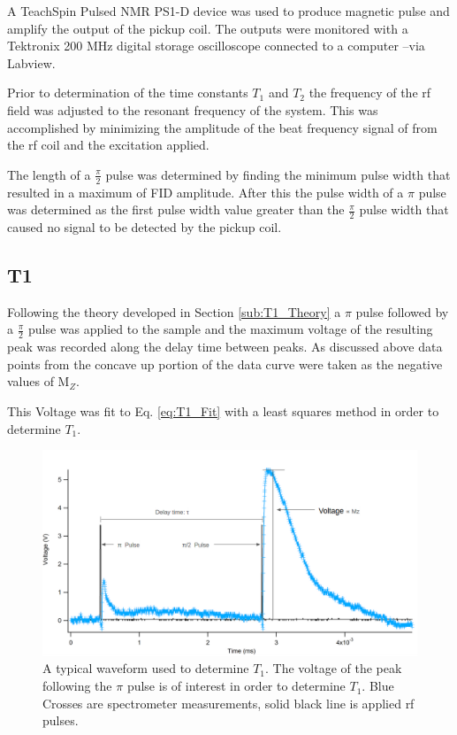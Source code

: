 \documentclass[11pt,letterpaper]{article}
\begin{document}
A TeachSpin Pulsed NMR PS1-D device was used to produce magnetic pulse and amplify the output of the pickup coil. The outputs were monitored with a Tektronix 200 MHz digital storage oscilloscope connected to a computer --via Labview.

Prior to determination of the time constants $T_1$ and $T_2$ the frequency of the rf field was adjusted to the resonant frequency of the system. This was accomplished by minimizing the amplitude of the beat frequency signal of from the rf coil and the excitation applied.

The length of a $\frac{\pi}{2}$ pulse was determined by finding the minimum pulse width that resulted in a maximum of FID amplitude. After this the pulse width of a $\pi$ pulse was determined as the first pulse width value greater than the $\frac{\pi}{2}$ pulse width that caused no signal to be detected by the pickup coil.

\subsection{T1}
Following the theory developed in Section \ref{sub:T1_Theory} a $\pi$ pulse followed by a $\frac{\pi}{2}$ pulse was applied to the sample and the maximum voltage of the resulting peak was recorded along the delay time between peaks. As discussed above data points from the concave up portion of the data curve were taken as the negative values of M$_Z$.

This Voltage was fit to Eq. \ref{eq:T1_Fit} with a least squares method in order to determine $T_1$.
\begin{figure}[h!]
  \centering
      \includegraphics[scale=.3]{Typical_T1_Annotated.png}
      \caption{A typical waveform used to determine $T_1$. The voltage of the peak following the $\pi$ pulse is of interest in order to determine $T_1$. Blue Crosses are spectrometer measurements, solid black line is applied rf pulses.}
      \label{fig:Typical_T1}
\end{figure}
\FloatBarrier
\end{document}
